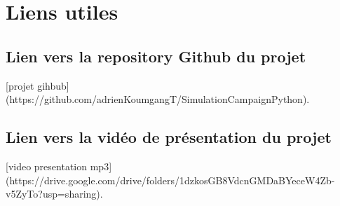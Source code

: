 \documentclass[a4paper, 11pt]{article}
\begin{document}
	\section{Liens utiles}
	
		\subsection{Lien vers la repository Github du projet}
		
		[projet gihbub](https://github.com/adrienKoumgangT/SimulationCampaignPython).
		
		\subsection{Lien vers la vidéo de présentation du projet}
		
		[video presentation mp3](https://drive.google.com/drive/folders/1dzkosGB8VdcnGMDaBYeceW4Zb-v5ZyTo?usp=sharing).
	
\end{document}
